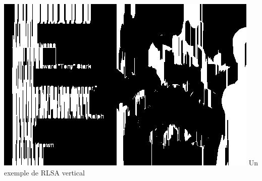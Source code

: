 \begin{center}
  \includegraphics[scale=1]{Pictures/vrlsa.png}
  Un exemple de RLSA vertical
\end{center}

\begin{center}
\end{center}
